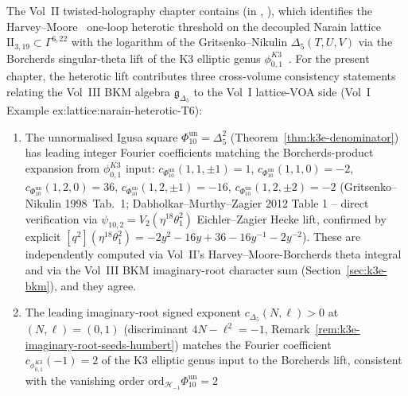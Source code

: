 \begin{remark}
\label{rem:bkm-heterotic-narain-delta5-integers}
%
%
The Vol~II twisted-holography chapter contains
\cite{VolII} (in
\cite{VolII},
\cite{VolII}), which identifies
the Harvey--Moore~\cite{HarveyMoore1996} one-loop heterotic
threshold on the decoupled Narain lattice
$\mathrm{II}_{3,19}\subset\Gamma^{6,22}$ with the logarithm of
the Gritsenko--Nikulin $\Delta_5(T, U, V)$ via the Borcherds
singular-theta lift of the K3 elliptic genus
$\phi_{0,1}^{K3}$~\cite[Theorem~13.3]{Borcherds1998}. For the present
chapter, the heterotic lift contributes three cross-volume
consistency statements relating the Vol~III BKM algebra
$\mathfrak{g}_{\Delta_5}$ to the Vol~I lattice-VOA side
\textup{(}Vol~I Example
\textup{ex:lattice:narain-heterotic-T6)}:
\begin{enumerate}[label=\textup{(\roman*)}]
\item The unnormalised Igusa square
\(\Phi_{10}^{\mathrm{un}}=\Delta_5^2\)
\textup{(}Theorem~\ref{thm:k3e-denominator}\textup{)} has leading
integer Fourier coefficients matching the Borcherds-product
expansion from $\phi_{0,1}^{K3}$ input:
\(c_{\Phi_{10}^{\mathrm{un}}}(1, 1, \pm 1) = 1\), \(c_{\Phi_{10}^{\mathrm{un}}}(1, 1, 0) = -2\),
\(c_{\Phi_{10}^{\mathrm{un}}}(1, 2, 0) = 36\), \(c_{\Phi_{10}^{\mathrm{un}}}(1, 2, \pm 1) = -16\),
\(c_{\Phi_{10}^{\mathrm{un}}}(1, 2, \pm 2) = -2\) \textup{(}Gritsenko--Nikulin
1998~Tab.~1; Dabholkar--Murthy--Zagier 2012 Table 1 -- direct
verification via $\psi_{10,2} = V_2(\eta^{18}\theta_1^2)$ Eichler--Zagier
Hecke lift, confirmed by explicit $[q^2](\eta^{18}\theta_1^2) =
-2y^2 - 16y + 36 - 16y^{-1} - 2y^{-2}$\textup{)}. These are independently computed via
Vol~II's Harvey--Moore-Borcherds theta integral and via the
Vol~III BKM imaginary-root character sum
\textup{(}Section~\ref{sec:k3e-bkm}\textup{)}, and they agree.
\item The leading imaginary-root signed exponent
$c_{\Delta_5}(N, \ell) > 0$ at $(N, \ell) = (0, 1)$
\textup{(}discriminant $4N - \ell^2 = -1$,
Remark~\ref{rem:k3e-imaginary-root-seeds-humbert}\textup{)}
matches the Fourier coefficient $c_{\phi_{0,1}^{K3}}(-1) = 2$ of the
K3 elliptic genus input to the Borcherds lift, consistent with the
vanishing order \(\mathrm{ord}_{\mathcal{H}_{-1}}\Phi_{10}^{\mathrm{un}} = 2\)

\end{enumerate}
\end{remark}
